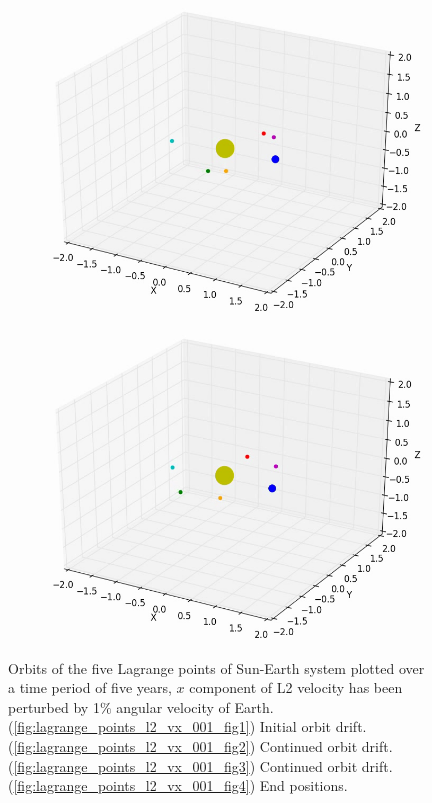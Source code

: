 \documentclass[10pt,letterpaper]{article}
\begin{document}
\begin{figure}[!htb]
  \includegraphics[width=\linewidth]{figures/lagrange_points/lagrange_points_l2_vx_001_3.png}
  \subcaption{}\label{fig:lagrange_points_l2_vx_001_fig3}
\endminipage
{}%
  \includegraphics[width=\linewidth]{figures/lagrange_points/lagrange_points_l2_vx_001_4.png}
  \subcaption{}\label{fig:lagrange_points_l2_vx_001_fig4}
\endminipage
\caption{Orbits of the five Lagrange points of Sun-Earth system plotted over a time period of five years, $x$ component of L2 velocity has been perturbed by 1$\%$ angular velocity of Earth.
(\ref{fig:lagrange_points_l2_vx_001_fig1}) Initial orbit drift. 
(\ref{fig:lagrange_points_l2_vx_001_fig2}) Continued orbit drift. 
(\ref{fig:lagrange_points_l2_vx_001_fig3}) Continued orbit drift. 
(\ref{fig:lagrange_points_l2_vx_001_fig4}) End positions.}\label{fig:lagrange_points_l2_vx_001}
\end{figure}
\end{document}
